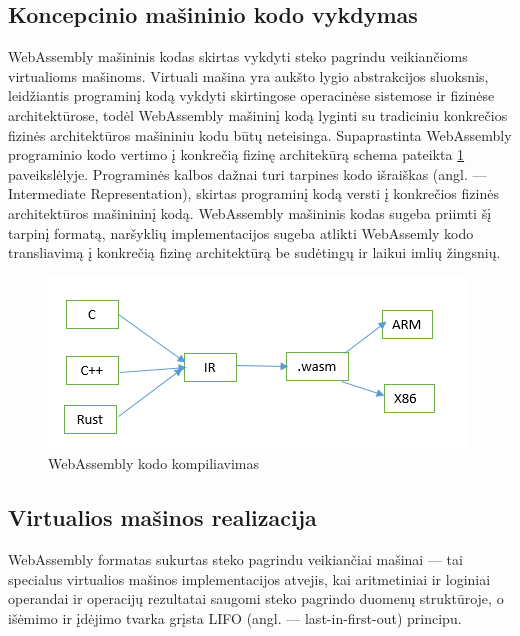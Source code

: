 \documentclass{VUMIFPSkursinis}
\begin{document}
\subsection{Koncepcinio mašininio kodo vykdymas}
WebAssembly mašininis kodas skirtas vykdyti steko pagrindu veikiančioms virtualioms mašinoms. Virtuali mašina yra aukšto lygio abstrakcijos sluoksnis, leidžiantis programinį kodą vykdyti skirtingose operacinėse sistemose ir fizinėse architektūrose, todėl WebAssembly mašininį kodą lyginti su tradiciniu konkrečios fizinės architektūros mašininiu kodu būtų neteisinga. \cite{DAC17} Supaprastinta WebAssembly programinio kodo vertimo į konkrečią fizinę architekūrą schema pateikta \ref{fig:wasm_compilation} paveikslėlyje. Programinės kalbos dažnai turi tarpines kodo išraiškas (angl. — Intermediate Representation), skirtas programinį kodą versti į konkrečios fizinės architektūros mašinininį kodą. WebAssembly mašininis kodas sugeba priimti šį tarpinį formatą, naršyklių implementacijos sugeba atlikti WebAssemly kodo transliavimą į konkrečią fizinę architektūrą be sudėtingų ir laikui imlių žingsnių. 

\begin{figure}[h!]
  \begin{center}
  \includegraphics[scale=1]{webassembly_kompiliavimas.png}
  \end{center}
  \caption{WebAssembly kodo kompiliavimas \cite{LCW17}}
  \label{fig:wasm_compilation}
\end{figure}

\subsection{Virtualios mašinos realizacija}

WebAssembly formatas sukurtas steko pagrindu veikiančiai mašinai — tai specialus virtualios mašinos implementacijos atvejis, kai aritmetiniai ir loginiai operandai ir operacijų rezultatai saugomi steko pagrindo duomenų struktūroje, o išėmimo ir įdėjimo tvarka grįsta LIFO (angl. — last-in-first-out) principu. 
\end{document}
